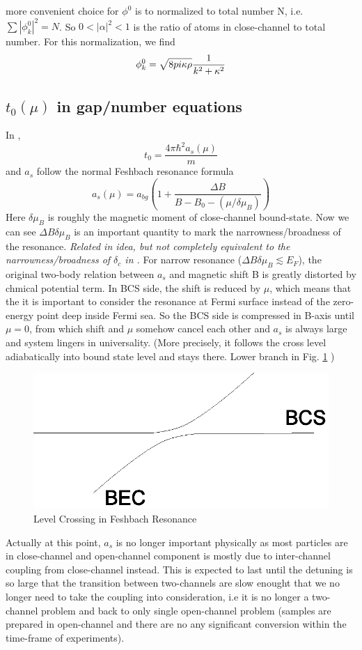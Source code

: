 \A more convenient choice for $\phi^{0}$ is to normalized to total number N, i.e. $\sum|\phi^{0}_{k}|^{2}=N$.  So $0<|\alpha|^{2}<1$ is the ratio of atoms in close-channel to total number.  For this normalization, we find 
\begin{equation}
\phi^{0}_{k}=\sqrt{8pi\kappa\rho}\frac{1}{k^{2}+\kappa^{2}}
\end{equation}
\subsection{$t_0(\mu)$ in gap/number equations}

In , 
\[
t_{0}=\frac{4\pi\hbar^{2}a_{s}(\mu)}{m}
\]
and $a_{s}$ follow the normal Feshbach resonance formula
\begin{equation}
a_{s}(\mu)=a_{bg}(1+\frac{\Delta{B}}{B-B_{0}-(\mu/\delta\mu_{B})})
\end{equation}
Here $\delta\mu_{B}$ is roughly the magnetic moment of close-channel bound-state.   
Now we can see $\Delta{B}\delta\mu_B$ is an important quantity to mark the narrowness/broadness of the resonance.  \emph{Related in idea, but not completely equivalent to the narrowness/broadness of $\delta_c$ in \cite{Leggett}.} For narrow resonance ($\Delta{B}\delta\mu_B\lesssim{E_F}$), the original two-body relation between $a_s$ and magnetic shift B is greatly distorted by chmical potential term.  In BCS side, the shift is reduced by $\mu$, which means that the it is important to consider the resonance at Fermi surface instead of the zero-energy point deep inside Fermi sea.  So the BCS side is compressed in B-axis until $\mu=0$, from which shift and $\mu$ somehow cancel each other and $a_s$ is always large and system lingers in universality. (More precisely, it follows the cross level adiabatically into bound state level and stays there. Lower branch in Fig. \ref{fig:levelcross} )
\begin{figure}[hhtb]
	\centering
		\includegraphics[width=.50\textwidth]{image/levelCross}
	\caption{Level Crossing in Feshbach Resonance \label{fig:levelcross}}	
\end{figure}
 Actually at this point, $a_s$ is no longer important physically as most particles are in close-channel and open-channel component is mostly due to inter-channel coupling from close-channel instead. This is expected to last until the detuning is so large that the transition between two-channels are slow enought that we no longer need to take the coupling into consideration, i.e it is no longer a two-channel problem and back to only single open-channel problem (samples are prepared in open-channel and there are no any significant conversion within the time-frame of experiments).  

